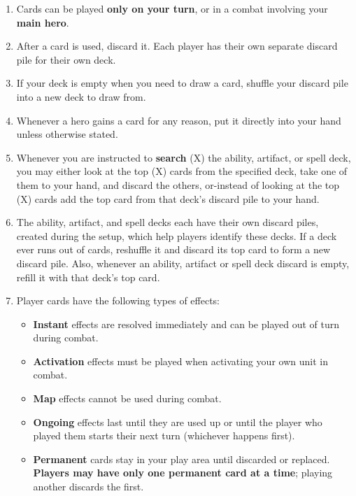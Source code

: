 \begin{enumerate}
  \item Cards can be played \textbf{only on your turn}, or in a combat involving your \textbf{main hero}.
  \item After a card is used, discard it.
    Each player has their own separate discard pile for their own deck.
  \item If your deck is empty when you need to draw a card, shuffle your discard pile into a new deck to draw from.
  \item Whenever a hero gains a card for any reason, put it directly into your hand unless otherwise stated.
  \item Whenever you are instructed to \textbf{search} (X) the ability, artifact, or spell deck, you may either look at the top (X) cards from the specified deck, take one of them to your hand, and discard the others, or-instead of looking at the top (X) cards add the top card from that deck’s discard pile to your hand.
  \item The ability, artifact, and spell decks each have their own discard piles, created during the setup, which help players identify these decks.
    If a deck ever runs out of cards, reshuffle it and discard its top card to form a new discard pile.
    Also, whenever an ability, artifact or spell deck discard is empty, refill it with that deck’s top card.
  \item Player cards have the following types of effects:
  \begin{itemize}
        \item \textbf{Instant}  effects are resolved immediately and can be played out of turn during combat.
        \item \textbf{Activation}  effects must be played when activating your own unit in combat.
        \item \textbf{Map}  effects cannot be used during combat.
        \item \textbf{Ongoing}  effects last until they are used up or until the player who played them starts their next turn (whichever happens first).
        \item \textbf{Permanent}  cards stay in your play area until discarded or replaced.
          \textbf{Players may have only one permanent card at a time}; playing another discards the first.
    \end{itemize}

\end{enumerate}

